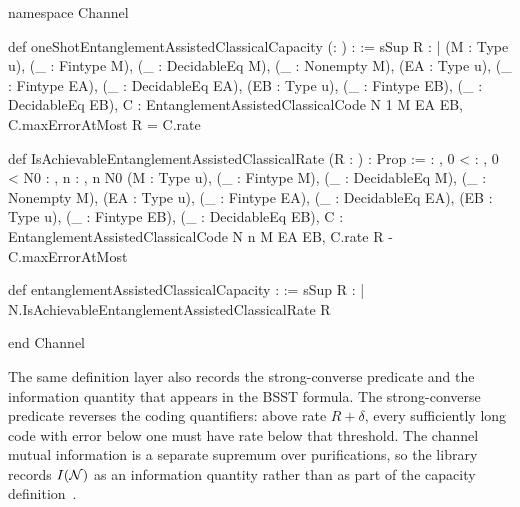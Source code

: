 \documentclass[10pt,a4paper]{article}
\newif\ifqitLineFocused
\newcommand{\qitHighlightSpan}[2]{%
	\ifnum\value{lstnumber}<#1\relax
	\else
		\ifnum\value{lstnumber}>#2\relax
		\else
			\qitLineFocusedtrue
		\fi
	\fi
}
\begin{document}
\begin{qitleancode}[title={Operational EA capacity},
qit focus={\qitHighlightSpan{9}{10}\qitHighlightSpan{13}{14}\qitHighlightSpan{19}{20}\qitHighlightSpan{22}{23}}]
namespace Channel

def oneShotEntanglementAssistedClassicalCapacity (\epsilon : \mathbbR) : \mathbbR :=
  sSup {R : \mathbbR |
    \exists (M : Type u), \exists (_ : Fintype M),
      \exists (_ : DecidableEq M), \exists (_ : Nonempty M),
        \exists (EA : Type u), \exists (_ : Fintype EA), \exists (_ : DecidableEq EA),
          \exists (EB : Type u), \exists (_ : Fintype EB), \exists (_ : DecidableEq EB),
            \exists C : EntanglementAssistedClassicalCode N 1 M EA EB,
              C.maxErrorAtMost \epsilon \wedge R = C.rate}

def IsAchievableEntanglementAssistedClassicalRate (R : \mathbbR) : Prop :=
  \forall \delta : \mathbbR, 0 < \delta \to \forall \epsilon : \mathbbR, 0 < \epsilon \to
    \exists N0 : \mathbbN, \forall n : \mathbbN, n \ge N0 \to
      \exists (M : Type u), \exists (_ : Fintype M),
        \exists (_ : DecidableEq M), \exists (_ : Nonempty M),
          \exists (EA : Type u), \exists (_ : Fintype EA), \exists (_ : DecidableEq EA),
            \exists (EB : Type u), \exists (_ : Fintype EB), \exists (_ : DecidableEq EB),
              \exists C : EntanglementAssistedClassicalCode N n M EA EB,
                C.rate \ge R - \delta \wedge C.maxErrorAtMost \epsilon

def entanglementAssistedClassicalCapacity : \mathbbR :=
  sSup {R : \mathbbR | N.IsAchievableEntanglementAssistedClassicalRate R}

end Channel
\end{qitleancode}
	
	The same definition layer also records the strong-converse predicate and the
	information quantity that appears in the BSST formula.  The strong-converse
	predicate reverses the coding quantifiers: above rate $R+\delta$, every
	sufficiently long code with error below one must have rate below that
	threshold.  The channel mutual information is a separate supremum over
	purifications, so the library records $I({\cal N})$ as an information quantity
	rather than as part of the capacity definition~\cite{Bennett1999,Bennett2002,KhatriLamiWilde2025Principles}.
	
\end{document}
